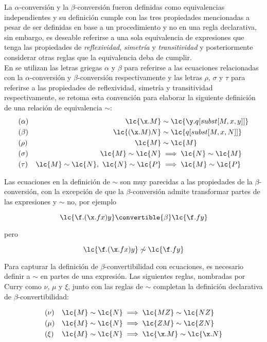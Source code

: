 La \(\alpha\)-conversión y la \(\beta\)-conversión fueron definidas como
equivalencias independientes y su definición cumple con las tres propiedades
mencionadas a pesar de ser definidas en base a un procedimiento y no en una
regla declarativa, sin embargo, es deseable referirse a una sola equivalencia de
expresiones que tenga las propiedades de \emph{reflexividad}, \emph{simetría} y
\emph{transitividad} y posteriormente considerar otras reglas que la equivalencia
deba de cumplir. \\

En \cite{Curry:CombinatoryLogicI} se utilizan las letras griegas \(\alpha\) y
\(\beta\) para referirse a las ecuaciones relacionadas con la
\(\alpha\)-conversión y \(\beta\)-conversión respectivamente y las letras
\(\rho\), \(\sigma\) y \(\tau\) para referirse a las propiedades de
reflexividad, simetría y transitividad respectivamente, se retoma esta convención
para elaborar la siguiente definición de una relación de equivalencia \(\sim\): \\

\begin{align*}
  &(\alpha) &\lc{\x.M} &\sim \lc{\y.q[subst[M,x,y]]} \\
  &(\beta)  &\lc{(\x.M)N} &\sim \lc{q[subst[M,x,N]]} \\
  &(\rho)   &\lc{M} &\sim \lc{M} \\
  &(\sigma) &\lc{M} \sim \lc{N} &\implies \lc{N} \sim \lc{M}\\
  &(\tau)   &\lc{M} \sim \lc{N},\ \lc{N} \sim \lc{P} &\implies \lc{M} \sim \lc{P}
\end{align*}

Las ecuaciones en la definición de \(\sim\) son muy parecidas a las propiedades
de la \(\beta\)-conversión, con la excepción de que la \(\beta\)-conversión
admite transformar partes de las expresiones y \(\sim\) no, por ejemplo

\[\lc{\f.(\x.f x)y} \convertible{\beta} \lc{\f.f y}\]

pero

\[\lc{\f.(\x.f x)y} \not\sim \lc{\f.f y}\]

Para capturar la definición de \(\beta\)-convertibilidad con ecuaciones, es
necesario definir a \(\sim\) en partes de una expresión. Las siguientes reglas,
nombradas por Curry \cite{Curry:CombinatoryLogicI} como \(\nu\), \(\mu\) y
\(\xi\), junto con las reglas de \(\sim\) completan la definición declarativa de
\(\beta\)-convertibilidad:

\begin{align*}
  &(\nu)  &\lc{M} \sim \lc{N} &\implies \lc{M Z} \sim \lc{N Z} \\
  &(\mu)  &\lc{M} \sim \lc{N} &\implies \lc{Z M} \sim \lc{Z N} \\
  &(\xi)  &\lc{M} \sim \lc{N} &\implies \lc{\x.M} \sim \lc{\x.N}
\end{align*}

